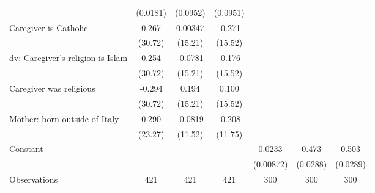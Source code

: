 {\begin{tabular}{l*{6}{c}}
                    &    (0.0181)         &    (0.0952)         &    (0.0951)         &                     &                     &                     \\
\addlinespace
Caregiver is Catholic&       0.267         &     0.00347         &      -0.271         &                     &                     &                     \\
                    &     (30.72)         &     (15.21)         &     (15.52)         &                     &                     &                     \\
\addlinespace
dv: Caregiver's religion is Islam&       0.254         &     -0.0781         &      -0.176         &                     &                     &                     \\
                    &     (30.72)         &     (15.21)         &     (15.52)         &                     &                     &                     \\
\addlinespace
Caregiver was religious&      -0.294         &       0.194         &       0.100         &                     &                     &                     \\
                    &     (30.72)         &     (15.21)         &     (15.52)         &                     &                     &                     \\
\addlinespace
Mother: born outside of Italy&       0.290         &     -0.0819         &      -0.208         &                     &                     &                     \\
                    &     (23.27)         &     (11.52)         &     (11.75)         &                     &                     &                     \\
\addlinespace
Constant            &                     &                     &                     &      0.0233\sym{**} &       0.473\sym{***}&       0.503\sym{***}\\
                    &                     &                     &                     &   (0.00872)         &    (0.0288)         &    (0.0289)         \\
\midrule
Observations        &         421         &         421         &         421         &         300         &         300         &         300         \\
\bottomrule
\end{tabular}
}
